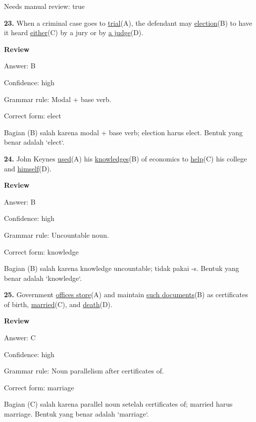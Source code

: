 \documentclass[12pt]{article}
\begin{document}
Needs manual review: true\par
\endgroup
\par
\vspace{\questionblockgap}
\noindent\textbf{23.} When a criminal case goes to \uline{trial}(A), the defendant may \uline{election}(B) to have it heard \uline{either}(C) by a jury or by \uline{a judge}(D).
\par
\begingroup
\setlength{\parskip}{0pt}
\setlength{\parindent}{0pt}
\textbf{Review}\par
Answer: B\par
Confidence: high\par
Grammar rule: Modal + base verb.\par
Correct form: elect\par
Bagian (B) salah karena modal + base verb; election harus elect. Bentuk yang benar adalah `elect`.\par
\endgroup
\par
\vspace{\questionblockgap}
\noindent\textbf{24.} John Keynes \uline{used}(A) his \uline{knowledges}(B) of economics to \uline{help}(C) his college and \uline{himself}(D).
\par
\begingroup
\setlength{\parskip}{0pt}
\setlength{\parindent}{0pt}
\textbf{Review}\par
Answer: B\par
Confidence: high\par
Grammar rule: Uncountable noun.\par
Correct form: knowledge\par
Bagian (B) salah karena knowledge uncountable; tidak pakai -s. Bentuk yang benar adalah `knowledge`.\par
\endgroup
\par
\vspace{\questionblockgap}
\noindent\textbf{25.} Government \uline{offices store}(A) and maintain \uline{such documents}(B) as certificates of birth, \uline{married}(C), and \uline{death}(D).
\par
\begingroup
\setlength{\parskip}{0pt}
\setlength{\parindent}{0pt}
\textbf{Review}\par
Answer: C\par
Confidence: high\par
Grammar rule: Noun parallelism after certificates of.\par
Correct form: marriage\par
Bagian (C) salah karena parallel noun setelah certificates of; married harus marriage. Bentuk yang benar adalah `marriage`.\par
\end{document}
